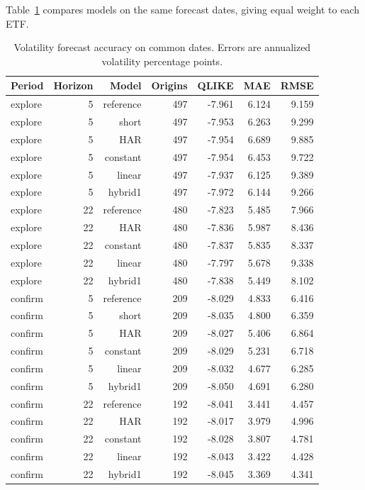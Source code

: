 \documentclass[11pt]{article}
\begin{document}
Table~\ref{tab:volatility} compares models on the same forecast dates, giving equal weight to each ETF.
\begin{table}[htbp]\centering\small\setlength{\tabcolsep}{4pt}\caption{Volatility forecast accuracy on common dates. Errors are annualized volatility percentage points.}\label{tab:volatility}
\begin{tabular}{lrrrrrr}
\hline
Period & Horizon & Model & Origins & QLIKE & MAE & RMSE \\
\hline
explore & 5 & reference & 497 & -7.961 & 6.124 & 9.159 \\
explore & 5 & short & 497 & -7.953 & 6.263 & 9.299 \\
explore & 5 & HAR & 497 & -7.954 & 6.689 & 9.885 \\
explore & 5 & constant & 497 & -7.954 & 6.453 & 9.722 \\
explore & 5 & linear & 497 & -7.937 & 6.125 & 9.389 \\
explore & 5 & hybrid1 & 497 & -7.972 & 6.144 & 9.266 \\
explore & 22 & reference & 480 & -7.823 & 5.485 & 7.966 \\
explore & 22 & HAR & 480 & -7.836 & 5.987 & 8.436 \\
explore & 22 & constant & 480 & -7.837 & 5.835 & 8.337 \\
explore & 22 & linear & 480 & -7.797 & 5.678 & 9.338 \\
explore & 22 & hybrid1 & 480 & -7.838 & 5.449 & 8.102 \\
confirm & 5 & reference & 209 & -8.029 & 4.833 & 6.416 \\
confirm & 5 & short & 209 & -8.035 & 4.800 & 6.359 \\
confirm & 5 & HAR & 209 & -8.027 & 5.406 & 6.864 \\
confirm & 5 & constant & 209 & -8.029 & 5.231 & 6.718 \\
confirm & 5 & linear & 209 & -8.032 & 4.677 & 6.285 \\
confirm & 5 & hybrid1 & 209 & -8.050 & 4.691 & 6.280 \\
confirm & 22 & reference & 192 & -8.041 & 3.441 & 4.457 \\
confirm & 22 & HAR & 192 & -8.017 & 3.979 & 4.996 \\
confirm & 22 & constant & 192 & -8.028 & 3.807 & 4.781 \\
confirm & 22 & linear & 192 & -8.043 & 3.422 & 4.428 \\
confirm & 22 & hybrid1 & 192 & -8.045 & 3.369 & 4.341 \\

\end{tabular}
\end{table}
\end{document}
